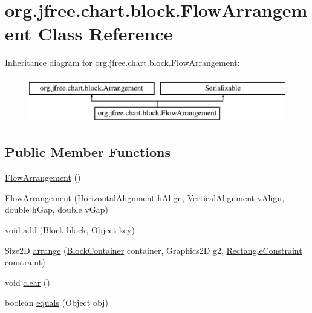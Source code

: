 \hypertarget{classorg_1_1jfree_1_1chart_1_1block_1_1_flow_arrangement}{}\section{org.\+jfree.\+chart.\+block.\+Flow\+Arrangement Class Reference}
\label{classorg_1_1jfree_1_1chart_1_1block_1_1_flow_arrangement}
Inheritance diagram for org.\+jfree.\+chart.\+block.\+Flow\+Arrangement\+:\begin{figure}[H]
\begin{center}
\leavevmode
\includegraphics[height=2.000000cm]{classorg_1_1jfree_1_1chart_1_1block_1_1_flow_arrangement}
\end{center}
\end{figure}
\subsection*{Public Member Functions}
\begin{DoxyCompactItemize}
\item 
\mbox{\hyperlink{classorg_1_1jfree_1_1chart_1_1block_1_1_flow_arrangement_ae571ae8c8f15ad60ef0b495f82453867}{Flow\+Arrangement}} ()
\item 
\mbox{\hyperlink{classorg_1_1jfree_1_1chart_1_1block_1_1_flow_arrangement_a8325094b7bfac966f125fa3f68e1367c}{Flow\+Arrangement}} (Horizontal\+Alignment h\+Align, Vertical\+Alignment v\+Align, double h\+Gap, double v\+Gap)
\item 
void \mbox{\hyperlink{classorg_1_1jfree_1_1chart_1_1block_1_1_flow_arrangement_aad51f7ee101f3ba0732e5b72be1992eb}{add}} (\mbox{\hyperlink{interfaceorg_1_1jfree_1_1chart_1_1block_1_1_block}{Block}} block, Object key)
\item 
Size2D \mbox{\hyperlink{classorg_1_1jfree_1_1chart_1_1block_1_1_flow_arrangement_a734acbd683e4cf73f2ebd5142197ad8d}{arrange}} (\mbox{\hyperlink{classorg_1_1jfree_1_1chart_1_1block_1_1_block_container}{Block\+Container}} container, Graphics2D g2, \mbox{\hyperlink{classorg_1_1jfree_1_1chart_1_1block_1_1_rectangle_constraint}{Rectangle\+Constraint}} constraint)
\item 
void \mbox{\hyperlink{classorg_1_1jfree_1_1chart_1_1block_1_1_flow_arrangement_a331e5fa3d4450da11973ab1e377b9b05}{clear}} ()
\item 
boolean \mbox{\hyperlink{classorg_1_1jfree_1_1chart_1_1block_1_1_flow_arrangement_a4887236e99024d30e6639f4352e7a937}{equals}} (Object obj)
\end{DoxyCompactItemize}

